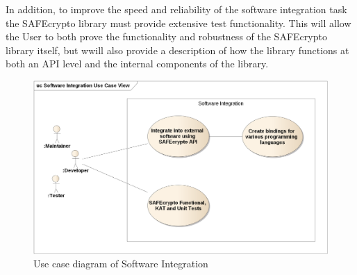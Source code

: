 In addition, to improve the speed and reliability of the software integration task the SAFEcrypto library must provide extensive test functionality. This will allow the User to both prove the functionality and robustness of the SAFEcrypto library itself, but wwill also provide a description of how the library functions at both an API level and the internal components of the library.

\begin{figure}[H]
\centering
\includegraphics[width=14cm]{sw_integration_use_case_view.png}
\caption{Use case diagram of Software Integration}
\label{fig:use_case_4}
\end{figure}

